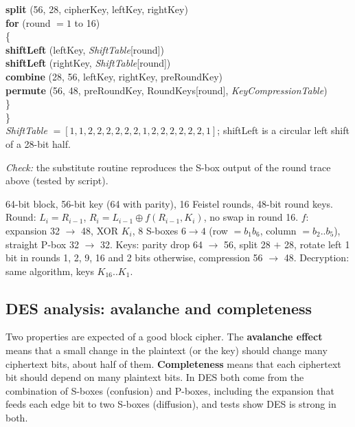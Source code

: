 \begin{worked}
\begin{minipage}[t]{0.47\linewidth}
\hspace*{1em}\textbf{split} (56, 28, cipherKey, leftKey, rightKey)\\
\hspace*{1em}\textbf{for} (round $= 1$ to 16)\\
\hspace*{1em}\{\\
\hspace*{2em}\textbf{shiftLeft} (leftKey, \emph{ShiftTable}[round])\\
\hspace*{2em}\textbf{shiftLeft} (rightKey, \emph{ShiftTable}[round])\\
\hspace*{2em}\textbf{combine} (28, 56, leftKey, rightKey, preRoundKey)\\
\hspace*{2em}\textbf{permute} (56, 48, preRoundKey, RoundKeys[round], \emph{KeyCompressionTable})\\
\hspace*{1em}\}\\
\}\\[2pt]
\emph{ShiftTable} $= [1, 1, 2, 2, 2, 2, 2, 2, 1, 2, 2, 2, 2, 2, 2, 1]$; shiftLeft is a circular left shift of a 28-bit half.
\end{minipage}

\medskip
\emph{Check:} the substitute routine reproduces the S-box output  of the round trace above (tested by script).
\end{worked}

\begin{mustknow}
64-bit block, 56-bit key (64 with parity), 16 Feistel rounds, 48-bit round keys. Round: $L_i = R_{i-1}$, $R_i = L_{i-1} \oplus f(R_{i-1}, K_i)$, no swap in round 16. $f$: expansion 32 $\to$ 48, XOR $K_i$, 8 S-boxes $6 \to 4$ (row $= b_1 b_6$, column $= b_2..b_5$), straight P-box 32 $\to$ 32. Keys: parity drop 64 $\to$ 56, split 28 $+$ 28, rotate left 1 bit in rounds 1, 2, 9, 16 and 2 bits otherwise, compression 56 $\to$ 48. Decryption: same algorithm, keys $K_{16}..K_1$.
\end{mustknow}

\subsection{DES analysis: avalanche and completeness}
Two properties are expected of a good block cipher. The \textbf{avalanche effect} means that a small change in the plaintext (or the key) should change many ciphertext bits, about half of them. \textbf{Completeness} means that each ciphertext bit should depend on many plaintext bits. In DES both come from the combination of S-boxes (confusion) and P-boxes, including the expansion that feeds each edge bit to two S-boxes (diffusion), and tests show DES is strong in both.

